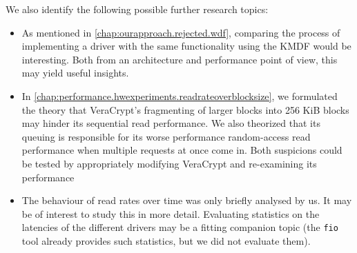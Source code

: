 We also identify the following possible further research topics:
\begin{itemize}
	\item As mentioned in \autoref{chap:ourapproach.rejected.wdf}, comparing the process of implementing a driver with the same functionality using the KMDF would be interesting. Both from an architecture and performance point of view, this may yield useful insights.
	\item In \autoref{chap:performance.hwexperiments.readrateoverblocksize}, we formulated the theory that VeraCrypt's fragmenting of larger blocks into 256 KiB blocks may hinder its sequential read performance. We also theorized that its queuing is responsible for its worse performance random-access read performance when multiple requests at once come in. Both suspicions could be tested by appropriately modifying VeraCrypt and re-examining its performance
	\item The behaviour of read rates over time was only briefly analysed by us. It may be of interest to study this in more detail. Evaluating statistics on the latencies of the different drivers may be a fitting companion topic (the \texttt{fio} tool already provides such statistics, but we did not evaluate them).
\end{itemize}